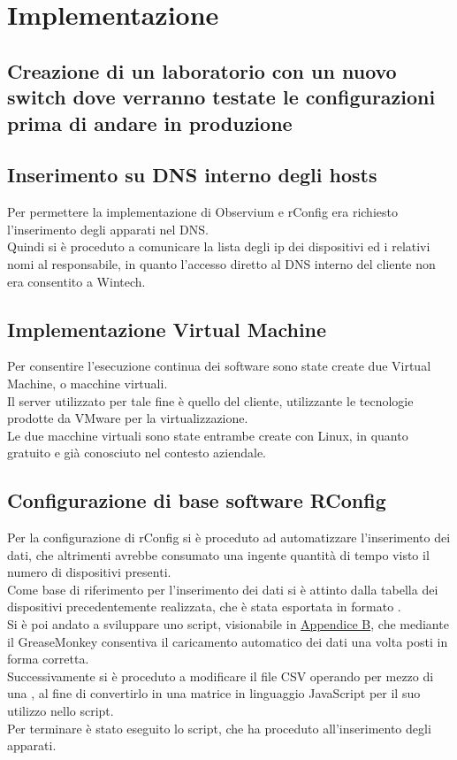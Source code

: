 \documentclass[Realizzazione.tex]{subfiles}
\begin{document}
\section{Implementazione}

\subsection{Creazione di un laboratorio con un nuovo switch dove verranno testate le configurazioni prima di andare in produzione}

\subsection{Inserimento su DNS interno degli hosts} 
Per permettere la implementazione di Observium e rConfig era richiesto l'inserimento degli apparati nel DNS. \\
Quindi si è proceduto a comunicare la lista degli ip dei dispositivi ed i relativi nomi al responsabile, in quanto l'accesso diretto al DNS interno del cliente non era consentito a Wintech.

\subsection{Implementazione Virtual Machine}
Per consentire l'esecuzione continua dei software sono state create due Virtual Machine, o macchine virtuali.\\
Il server utilizzato per tale fine è quello del cliente, utilizzante le tecnologie prodotte da VMware per la virtualizzazione. \\
Le due macchine virtuali sono state entrambe create con Linux, in quanto gratuito e già conosciuto nel contesto aziendale.

\subsection{Configurazione di base software RConfig}
Per la configurazione di rConfig si è proceduto ad automatizzare l'inserimento dei dati, che altrimenti avrebbe consumato una ingente quantità di tempo visto il numero di dispositivi presenti. \\
Come base di riferimento per l'inserimento dei dati si è attinto dalla tabella dei dispositivi 
precedentemente realizzata, che è stata esportata in formato .\\
Si è poi andato a sviluppare uno script, visionabile in \hyperref[sec:Appendice B]{Appendice B}, che mediante il GreaseMonkey consentiva il caricamento automatico dei dati una volta posti in forma corretta. \\
Successivamente si è proceduto a modificare il file CSV operando per mezzo di una , al fine di convertirlo in una matrice in linguaggio JavaScript per il suo utilizzo nello script. \\
Per terminare è stato eseguito lo script, che ha proceduto all'inserimento degli apparati. \\
\end{document}
